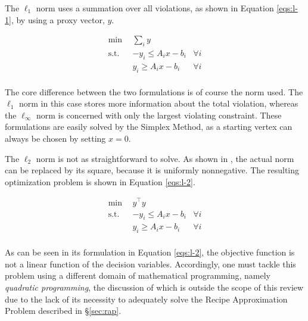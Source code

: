 The $\ell_1$ norm uses a summation over all violations, as shown in
Equation \ref{eqs:l-1}, by using a proxy vector, $y$.

\begin{subequations}\label{eqs:l-1}
  \begin{align}
    \min \:\: & 
    \sum_i y
    & \\
    \text{s.t.} \:\: &
    - y_i \leq A_i x - b_i
    & \forall i \\
    &
    y_i \geq A_i x - b_i
    & \forall i \\
  \end{align}
\end{subequations}

The core difference between the two formulations is of course the norm used. The
$\ell_1$ norm in this case stores more information about the total violation,
whereas the $\ell_\infty$ norm is concerned with only the largest violating
constraint. These formulations are easily solved by the Simplex Method, as a
starting vertex can always be chosen by setting $x = 0$.

The $\ell_2$ norm is not as straightforward to solve. As shown
in \cite{ferris_linear_2008}, the actual norm can be replaced by its square,
because it is uniformly nonnegative. The resulting optimization problem is shown
in Equation \ref{eqs:l-2}.

\begin{subequations}\label{eqs:l-2}
  \begin{align}
    \min \:\: & 
    y^\top y
    & \\
    \text{s.t.} \:\: &
    - y_i \leq A_i x - b_i
    & \forall i \\
    &
    y_i \geq A_i x - b_i
    & \forall i \\
  \end{align}
\end{subequations}

As can be seen in its formulation in Equation \ref{eqs:l-2}, the objective
function is not a linear function of the decision variables. Accordingly, one
must tackle this problem using a different domain of mathematical programming,
namely \textit{quadratic programming}, the discussion of which is outside the
scope of this review due to the lack of its necessity to adequately solve the
Recipe Approximation Problem described in \S\ref{sec:rap}.
